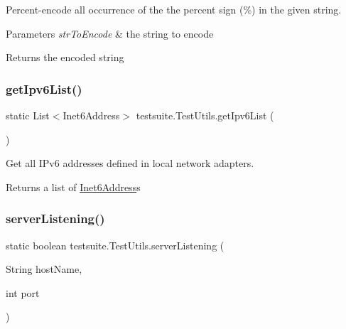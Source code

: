 Percent-\/encode all occurrence of the the percent sign (\%) in the given string.


\begin{DoxyParams}{Parameters}
{\em str\+To\+Encode} & the string to encode \\
\hline
\end{DoxyParams}
\begin{DoxyReturn}{Returns}
the encoded string 
\end{DoxyReturn}
\mbox{\label{classtestsuite_1_1_test_utils_a7b4afe11135792d356ef72338be74054}} 
\subsubsection{\texorpdfstring{get\+Ipv6\+List()}{getIpv6List()}}
{\footnotesize\ttfamily static List$<$Inet6\+Address$>$ testsuite.\+Test\+Utils.\+get\+Ipv6\+List (\begin{DoxyParamCaption}{ }\end{DoxyParamCaption})\hspace{0.3cm}{\ttfamily [static]}}

Get all I\+Pv6 addresses defined in local network adapters.

\begin{DoxyReturn}{Returns}
a list of \mbox{\hyperlink{}{Inet6\+Address}}s 
\end{DoxyReturn}
\mbox{\label{classtestsuite_1_1_test_utils_a6a23cc4c25f5ec50a93d7735d8591f74}} 
\subsubsection{\texorpdfstring{server\+Listening()}{serverListening()}\hspace{0.1cm}{\footnotesize\ttfamily [1/2]}}
{\footnotesize\ttfamily static boolean testsuite.\+Test\+Utils.\+server\+Listening (\begin{DoxyParamCaption}\item[{String}]{host\+Name,  }\item[{int}]{port }\end{DoxyParamCaption})\hspace{0.3cm}{\ttfamily [static]}}

